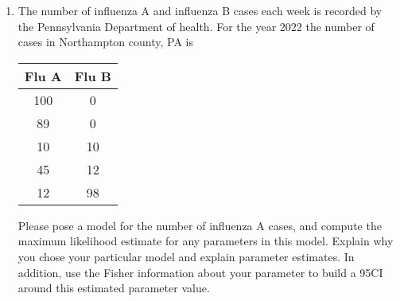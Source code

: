 \begin{enumerate}
    \item The number of influenza A and influenza B cases each week is recorded by the Pennsylvania Department of health. 
    For the year 2022 the number of cases in Northampton county, PA is 
    \begin{table}[ht!]
        \centering
        \begin{tabular}{cc}
           Flu A & Flu B  \\
           \hline
            100 & 0 \\ 
            89 & 0 \\ 
            10 & 10 \\ 
            45 & 12 \\ 
            12 & 98 \\ 
        \end{tabular}
    \end{table}
    Please pose a model for the number of influenza A cases, and compute the maximum likelihood estimate for any parameters in this model. 
    Explain why you chose your particular model and explain parameter estimates.
    In addition, use the Fisher information about your parameter to build a 95CI around this estimated parameter value.
    
\end{enumerate}




